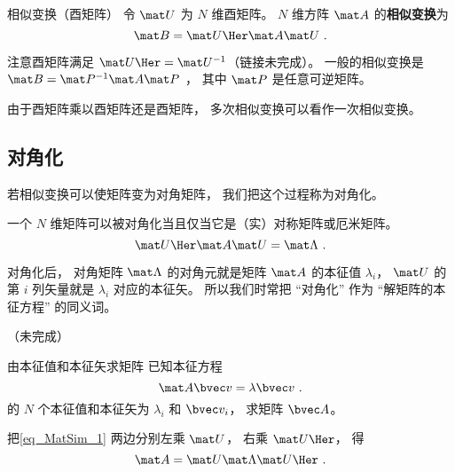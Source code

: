 
\begin{issues}
\issueDraft
\end{issues}



\begin{definition}{相似变换（酉矩阵）}\label{def_MatSim_1}
令 $\mat U$ 为 $N$ 维酉矩阵。 $N$ 维方阵 $\mat A$ 的\textbf{相似变换}为
\begin{equation}
\mat B = \mat U\Her \mat A \mat U~.
\end{equation}
\end{definition}

注意酉矩阵满足 $\mat U\Her = \mat U^{-1}$（链接未完成）。 一般的相似变换是 $\mat B = \mat P^{-1} \mat A \mat P$ ， 其中 $\mat P$ 是任意可逆矩阵。

由于酉矩阵乘以酉矩阵还是酉矩阵， 多次相似变换可以看作一次相似变换。

\subsection{对角化}
若相似变换可以使矩阵变为对角矩阵， 我们把这个过程称为对角化。

一个 $N$ 维矩阵可以被对角化当且仅当它是（实）对称矩阵或厄米矩阵。
\begin{equation}\label{eq_MatSim_1}
\mat U\Her \mat A \mat U = \mat \Lambda~.
\end{equation}

对角化后， 对角矩阵 $\mat \Lambda$ 的对角元就是矩阵 $\mat A$ 的本征值 $\lambda_i$， $\mat U$ 的第 $i$ 列矢量就是 $\lambda_i$ 对应的本征矢。 所以我们时常把 “对角化” 作为 “解矩阵的本征方程” 的同义词。

（未完成）

\begin{example}{由本征值和本征矢求矩阵}
已知本征方程
\begin{equation}
\mat A \bvec v = \lambda \bvec v~.
\end{equation}
的 $N$ 个本征值和本征矢为 $\lambda_i$ 和 $\bvec v_i$， 求矩阵 $\bvec A$。

把\autoref{eq_MatSim_1} 两边分别左乘 $\mat U$， 右乘 $\mat U\Her$， 得
\begin{equation}
\mat A = \mat U \mat \Lambda \mat U\Her~.
\end{equation}
\end{example}
